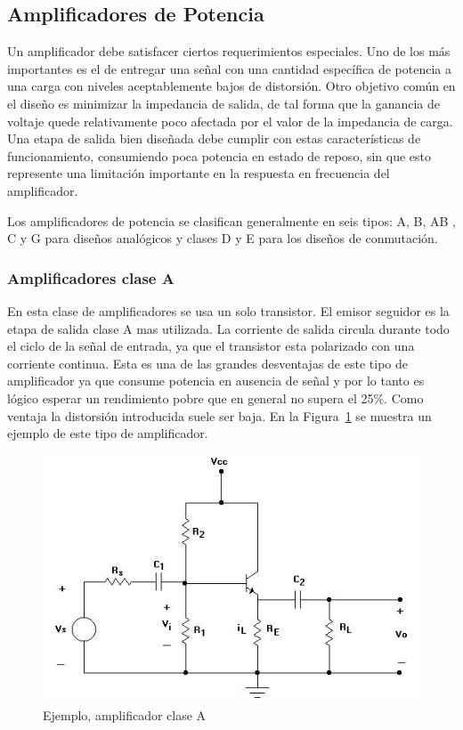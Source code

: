 	
\subsection{Amplificadores de Potencia}
	
Un amplificador debe satisfacer ciertos requerimientos especiales. Uno de los más importantes es el de entregar una señal con una cantidad específica de potencia a una carga con niveles aceptablemente bajos de distorsión. Otro objetivo común en el diseño es minimizar la impedancia de salida, de tal forma que la ganancia de voltaje quede relativamente poco afectada por el valor de la impedancia de carga. Una etapa de salida bien diseñada debe cumplir con estas características de funcionamiento, consumiendo poca potencia en estado de reposo, sin que esto represente una limitación importante en la respuesta en frecuencia del amplificador. 
 
Los amplificadores de potencia  se clasifican generalmente en seis tipos: A, B, AB , C y G para diseños analógicos y clases D y E para los diseños de conmutación. 
\medskip 


\subsubsection*{Amplificadores clase A}


En esta clase de amplificadores se usa un solo transistor. El emisor seguidor es la etapa de salida clase A mas utilizada. La corriente de salida circula durante todo el ciclo de la señal de entrada, ya que el transistor esta polarizado con una corriente continua. Esta es una de las grandes desventajas de este tipo de amplificador ya que consume potencia en ausencia de señal y por lo tanto es lógico esperar un rendimiento pobre que en general no supera el 25\%. Como ventaja la distorsión introducida suele ser baja. En la Figura~\ref{ampliA} se muestra un ejemplo de este tipo de amplificador.
 
\begin{figure}[H]
\centering
\includegraphics[scale=0.6]{img/ampliA.png}
\caption{Ejemplo, amplificador clase A}
\label{ampliA} 
\end{figure}

